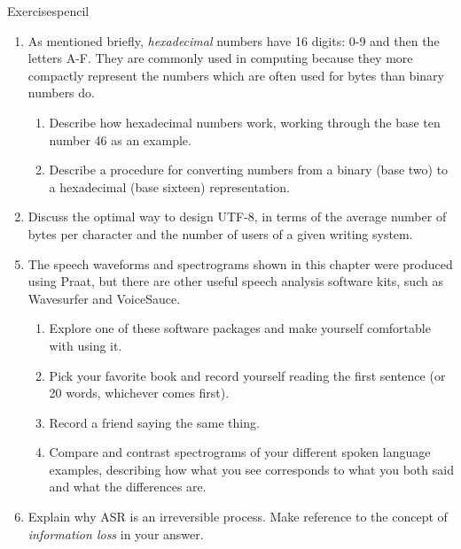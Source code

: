 \begin{tblsfilledsymbol}{Exercises}{pencil}
\begin{enumerate}
\item  As mentioned briefly, \emph{hexadecimal} numbers
  have 16 digits: 0-9 and then the letters A-F. They are commonly used
  in computing because they more compactly represent the numbers which
  are often used for bytes than binary numbers do.
  \begin{enumerate}
  \item Describe how hexadecimal numbers work, working through the
    base ten number 46 as an example.
  \item Describe a procedure for converting numbers from a binary
    (base two) to a hexadecimal (base sixteen) representation.
  \end{enumerate}
\item  Discuss the optimal way to design UTF-8, in terms of
  the average number of bytes per character and the number of users of
  a given writing system.
\end{enumerate}

\begin{enumerate}
\setcounter{enumi}{4}

\item  The speech waveforms and spectrograms shown in
  this chapter were produced using Praat, but there are other useful
  speech analysis software kits, such as Wavesurfer and VoiceSauce.

  \begin{enumerate}
  \item Explore one of these software packages and make yourself comfortable with using it.
  \item Pick your favorite book and record yourself reading the first
    sentence (or 20 words, whichever comes first).
  \item Record a friend saying the same thing.
  \item Compare and contrast spectrograms of your different spoken
    language examples, describing how what you see corresponds to what
    you both said and what the differences are.
  \end{enumerate}
\item  Explain why ASR is an irreversible process. Make
  reference to the concept of \emph{information loss} in your answer.

\end{enumerate}
\end{tblsfilledsymbol}





